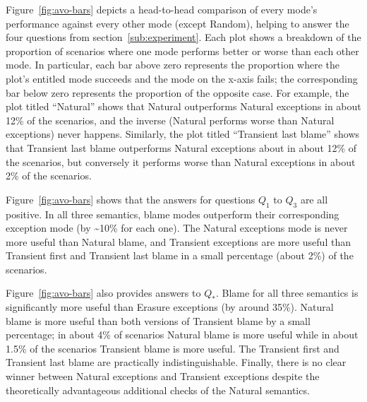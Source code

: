 Figure~\ref{fig:avo-bars} depicts a head-to-head comparison of every mode's performance against every other mode (except Random), helping to answer the four questions from section~\ref{sub:experiment}.
Each plot shows a breakdown of the proportion of scenarios where one mode performs better or worse than each other mode.
In particular, each bar above zero represents the proportion where the plot's entitled mode succeeds and the mode on the x-axis fails; the corresponding bar below zero represents the proportion of the opposite case.
For example, the plot titled ``Natural'' shows that Natural outperforms Natural exceptions in about 12\% of the scenarios, and the inverse (Natural performs worse than Natural exceptions) never happens.
Similarly, the plot titled ``Transient last blame'' shows that Transient last blame outperforms Natural exceptions about in about 12\% of the scenarios, but conversely it performs worse than Natural exceptions in about 2\% of the scenarios.

Figure~\ref{fig:avo-bars} shows that the answers for questions $Q_1$ to $Q_3$ are all positive.
In all three semantics, blame modes outperform their corresponding exception mode (by \textasciitilde10\% for each one).
The Natural exceptions mode is never more useful than Natural blame, and  Transient
exceptions are more useful than Transient first and Transient last blame
in a small percentage (about 2\%) of the scenarios. 

Figure~\ref{fig:avo-bars} also provides answers to $Q_*$.
Blame for all three semantics is significantly
more useful than Erasure exceptions (by around 35\%). Natural blame is
more useful than both versions of Transient blame by a small percentage;
in about 4\% of scenarios Natural blame is more useful while in about 1.5\% of the
scenarios Transient blame is more useful. The Transient first and
Transient last blame are practically indistinguishable. Finally, there is
no clear winner between Natural exceptions and Transient exceptions
despite the theoretically advantageous additional checks of the Natural
semantics.

